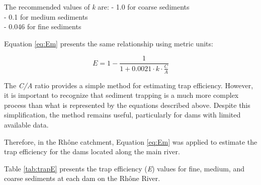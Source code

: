 \documentclass[
]{book}
\begin{document}
The recommended values of \emph{k} are:
- 1.0 for coarse sediments\\
- 0.1 for medium sediments\\
- 0.046 for fine sediments

Equation \eqref{eq:Em} presents the same relationship using metric units:

\begin{equation}
  E = 1 - \frac{1}{1 + 0.0021 \cdot k \cdot \frac{C}{A}}
  \label{eq:Em}
\end{equation}

The \emph{C/A} ratio provides a simple method for estimating trap efficiency. However, it is important to recognize that sediment trapping is a much more complex process than what is represented by the equations described above. Despite this simplification, the method remains useful, particularly for dams with limited available data.

Therefore, in the Rhône catchment, Equation \eqref{eq:Em} was applied to estimate the trap efficiency for the dams located along the main river.

Table \ref{tab:trapE} presents the trap efficiency (\emph{E}) values for fine, medium, and coarse sediments at each dam on the Rhône River.
\end{document}
